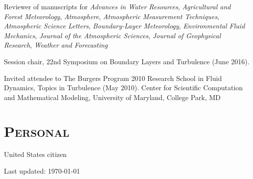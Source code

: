 \documentclass[11pt,letterpaper]{article}
\begin{document}
Reviewer of manuscripts for \textit{Advances in Water Resources},
\textit{Agricultural and Forest Meteorology},
\textit{Atmosphere},
\textit{Atmospheric Measurement Techniques},
\textit{Atmospheric Science Letters}, \textit{Boundary-Layer Meteorology},
\textit{Environmental Fluid Mechanics}, \textit{Journal of the Atmospheric
  Sciences}, \textit{Journal of Geophysical Research}, \textit{Weather and Forecasting} 

Session chair, 22nd Symposium on Boundary Layers and Turbulence (June 2016).

Invited attendee to The Burgers Program 2010 Research School in Fluid Dynamics, Topics in Turbulence (May 2010). 
Center for Scientific Computation and Mathematical Modeling, University of Maryland, College Park, MD 

\section*{\textsc{Personal}} 
United States citizen

\bigskip
{\small Last updated: \today}
\end{document}
